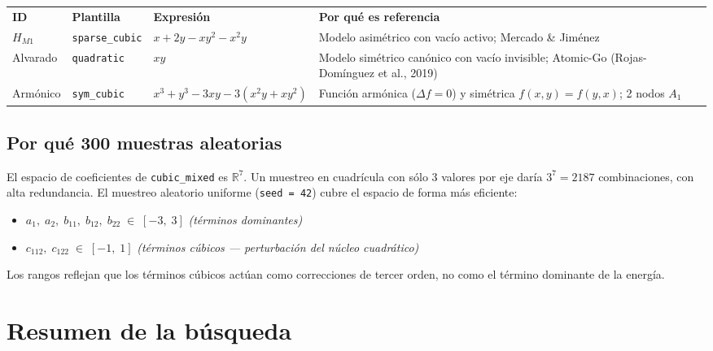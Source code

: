 \documentclass[11pt, a4paper]{article}
\newcommand{\TH}[1]{\cellcolor{cTHbg}\color{white}\textbf{#1}}
\begin{document}
\medskip
\begin{center}
\begin{tabularx}{0.96\textwidth}{L{1.8cm}L{2.6cm}L{4.2cm}X}
  \TH{ID} & \TH{Plantilla} & \TH{Expresi\'on} & \TH{Por qu\'e es referencia} \\[1pt]
  $H_{M1}$
    & \texttt{sparse\_cubic}
    & $x + 2y - xy^2 - x^2y$
    & Modelo asim\'etrico con vac\'io activo; Mercado \& Jim\'enez \\
  Alvarado
    & \texttt{quadratic}
    & $xy$
    & Modelo sim\'etrico can\'onico con vac\'io invisible;
      Atomic-Go (Rojas-Dom\'inguez et al., 2019) \\
  Arm\'onico
    & \texttt{sym\_cubic}
    & $x^3+y^3 - 3xy - 3(x^2y+xy^2)$
    & Funci\'on arm\'onica ($\Delta f=0$) y sim\'etrica $f(x,y)=f(y,x)$;
      2 nodos $A_1$ \\
\end{tabularx}
\end{center}
\medskip

\subsection{Por qu\'e 300 muestras aleatorias}

El espacio de coeficientes de \texttt{cubic\_mixed} es $\mathbb{R}^7$. Un
muestreo en cuadr\'icula con s\'olo 3 valores por eje dar\'ia $3^7 = 2187$
combinaciones, con alta redundancia. El muestreo aleatorio uniforme
(\texttt{seed = 42}) cubre el espacio de forma m\'as eficiente:

\begin{itemize}
  \item $a_1,\; a_2,\; b_{11},\; b_{12},\; b_{22} \;\in\; [-3,\; 3]$
        \quad\textit{(t\'erminos dominantes)}
  \item $c_{112},\; c_{122} \;\in\; [-1,\; 1]$
        \quad\textit{(t\'erminos c\'ubicos --- perturbaci\'on del n\'ucleo cuadr\'atico)}
\end{itemize}

Los rangos reflejan que los t\'erminos c\'ubicos act\'uan como correcciones de
tercer orden, no como el t\'ermino dominante de la energ\'ia.

\section{Resumen de la b\'usqueda}
\end{document}
